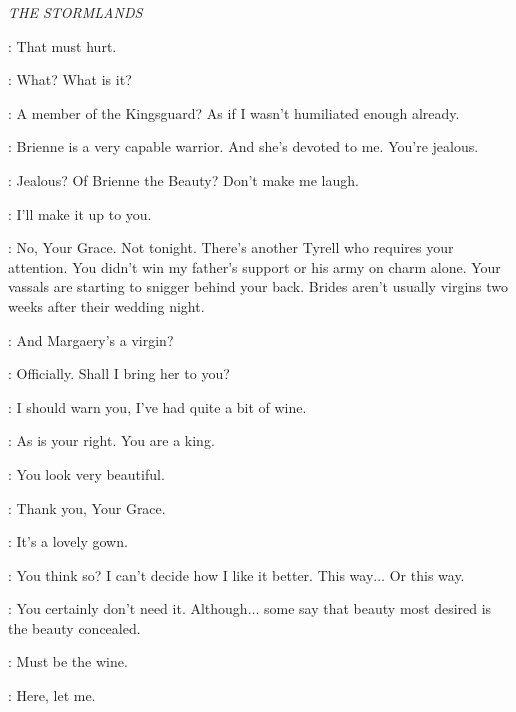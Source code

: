 \scene

\textit{THE STORMLANDS} 


\RENLY: That must hurt. 


\RENLY: What? What is it? 

\LORAS: A member of the Kingsguard? As if I wasn't humiliated enough already. 

\RENLY: Brienne is a very capable warrior. And she's devoted to me. You're jealous. 

\LORAS: Jealous? Of Brienne the Beauty? Don't make me laugh. 

\RENLY: I'll make it up to you. 

\LORAS: No, Your Grace. Not tonight. There's another Tyrell who requires your attention. You didn't win my father's support or his army on charm alone. Your vassals are starting to snigger behind your back. Brides aren't usually virgins two weeks after their wedding night. 

\RENLY: And Margaery's a virgin? 

\LORAS: Officially. Shall I bring her to you? 


\RENLY: I should warn you, I've had quite a bit of wine. 

\MARGAERY: As is your right. You are a king. 

\RENLY: You look very beautiful. 

\MARGAERY: Thank you, Your Grace. 

\RENLY: It's a lovely gown. 

\MARGAERY: You think so? I can't decide how I like it better. This way$\ldots$  Or this way.


\RENLY: You certainly don't need it. Although$\ldots$ some say that beauty most desired is the beauty concealed. 


\RENLY: Must be the wine. 

\MARGAERY: Here, let me. 

